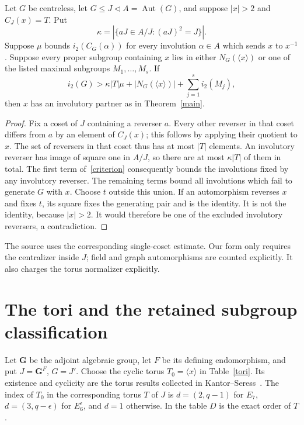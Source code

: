 \documentclass[10pt,a4paper]{article}
\newcommand{\Aut}{\operatorname{Aut}}
\begin{document}
\begin{lemma}\label{cosets}
Let $G$ be centreless, let $G\le J\lhd A=\Aut(G)$, and suppose
$|x|>2$ and $C_J(x)=T$. Put
\[
 \kappa=|\{aJ\in A/J:(aJ)^2=J\}|.
\]
Suppose $\mu$ bounds $i_2(C_G(\alpha))$ for every involution $\alpha\in A$
which sends $x$ to $x^{-1}$. Suppose every proper subgroup containing $x$
lies in either $N_G(\langle x\rangle)$ or one of the listed maximal
subgroups $M_1,\ldots,M_s$. If
\begin{equation}\label{criterion}
 i_2(G)>\kappa|T|\mu+
       |N_G(\langle x\rangle)|+\sum_{j=1}^s i_2(M_j),
\end{equation}
then $x$ has an involutory partner as in Theorem~\ref{main}.
\end{lemma}
\begin{proof}
Fix a coset of $J$ containing a reverser $a$. Every other reverser in
that coset differs from $a$ by an element of $C_J(x)$; this follows by
applying their quotient to $x$. The set of reversers in that coset thus
has at most $|T|$ elements. An involutory reverser has image of square one
in $A/J$, so there are at most $\kappa|T|$ of them in total.
The first term of~\eqref{criterion} consequently bounds the involutions
fixed by any involutory reverser. The remaining terms bound all
involutions which fail to generate $G$ with $x$. Choose $t$ outside this
union. If an automorphism reverses $x$ and fixes $t$, its square fixes
the generating pair and is the identity. It is not the identity, because
$|x|>2$. It would therefore be one of the excluded involutory reversers,
a contradiction.
\end{proof}

The source uses the corresponding single-coset estimate. Our form only
requires the centralizer inside $J$; field and graph automorphisms are
counted explicitly. It also charges the torus normalizer explicitly.

\section{The tori and the retained subgroup classification}

Let $\mathbf G$ be the adjoint algebraic group, let $F$ be its defining
endomorphism, and put $J=\mathbf G^F$, $G=J'$. Choose the cyclic torus
$T_0=\langle x\rangle$ in Table~\ref{tori}. Its existence and cyclicity
are the torus results collected in Kantor--Seress~\cite[Section~2]{KS}.
The index of $T_0$ in the corresponding torus $T$ of $J$ is
$d=(2,q-1)$ for $E_7$, $d=(3,q-\epsilon)$ for $E_6^\epsilon$, and $d=1$
otherwise. In the table $D$ is the exact order of $T$.
\end{document}
